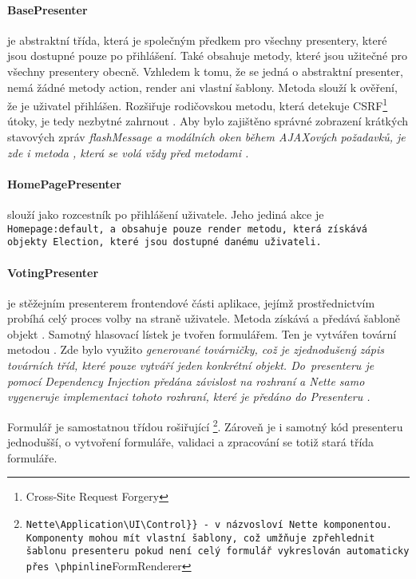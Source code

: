 \paragraph{BasePresenter} je abstraktní třída, která je společným předkem pro všechny presentery, které jsou dostupné pouze po přihlášení. Také obsahuje metody, které jsou užitečné pro všechny presentery obecně. Vzhledem k tomu, že se jedná o abstraktní presenter, nemá žádné metody action, render ani vlastní šablony. 
Metoda  slouží k ověření, že je uživatel přihlášen. Rozšiřuje rodičovskou metodu, která detekuje CSRF\footnote{Cross-Site Request Forgery} útoky, je tedy nezbytné zahrnout %
. Aby bylo zajištěno správné zobrazení krátkých stavových zpráv \it{flashMessage} a modálních oken během AJAXových požadavků, je zde i metoda , která se volá vždy před metodami .


\paragraph{HomePagePresenter} slouží jako rozcestník po přihlášení uživatele. Jeho jediná akce je \tt{Homepage:default}, a obsahuje pouze render metodu, která získává objekty Election, které jsou dostupné danému uživateli.


\paragraph{VotingPresenter} je stěžejním presenterem frontendové části aplikace, jejímž prostřednictvím probíhá celý proces volby na straně uživatele. Metoda  získává a   předává šabloně objekt . Samotný hlasovací lístek je tvořen formulářem. Ten je vytvářen tovární metodou . Zde bylo využito \it{generované továrničky}, což je zjednodušený zápis továrních tříd, které pouze vytváří jeden konkrétní objekt. Do~presenteru je pomocí Dependency Injection předána závislost na rozhraní  a Nette samo vygeneruje implementaci tohoto rozhraní, které je předáno do Presenteru \cite{Planette}.

Formulář  je samostatnou třídou rošiřující \footnote{\Verb{Nette\Application\UI\Control}} - v názvosloví Nette komponentou. Komponenty mohou mít vlastní šablony, což umžňuje zpřehlednit šablonu presenteru pokud není celý formulář vykreslován automaticky přes \phpinline{FormRenderer}. Zároveň je i samotný kód presenteru jednodušší, o vytvoření formuláře, validaci a zpracování se totiž stará třída formuláře.

